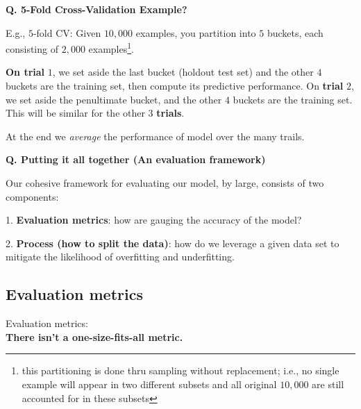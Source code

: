 \begin{frame}[fragile]{\textbf{Q. 5-Fold Cross-Validation Example?}}
  \begin{wideitemize}
    \item E.g., $5$-fold CV: Given $10,000$ examples, you partition into $5$ buckets, each consisting
    of $2,000$ examples\footnote{this partitioning is done thru sampling without
      replacement; i.e., no single example will appear in two different subsets
      and all original $10,000$ are still accounted for in these subsets}.
    \item \textbf{On trial} $1$, we set aside the last bucket (holdout test set)
      and the other $4$ buckets are the training set, then compute its
      predictive performance. On \textbf{trial} $2$, we set aside the
      penultimate bucket, and the other $4$ buckets are the training set. This
      will be similar for the other $3$ \textbf{trials}.
    \item At the end we \textit{average} the performance of model over the many trails.
  \end{wideitemize}
\end{frame}

\begin{frame}[fragile]{\textbf{Q. Putting it all together (An evaluation framework)}}
  \begin{wideitemize}
    \item Our cohesive framework for evaluating our model, by large, consists of two components:\medskip
    \begin{wideitemize}
      \item[1.] \textbf{Evaluation metrics}: how are gauging the accuracy of the model?
      \item[2.] \textbf{Process (how to split the data)}: how do we leverage a given
      data set to mitigate the likelihood of overfitting and underfitting.
    \end{wideitemize}
  \end{wideitemize}
\end{frame}

\subsection{Evaluation metrics}
\begin{transitionsubframe}
  \begin{center}
    \Huge Evaluation metrics:\\\textbf{There isn't a one-size-fits-all metric.}
  \end{center}
\end{transitionsubframe}

